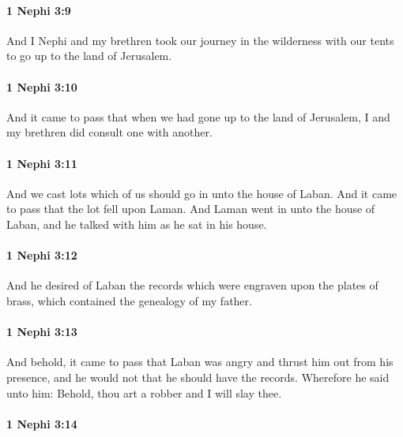 		\paragraph{1 Nephi 3:9} %
			\label{1NEPHI-3-9}

			And I Nephi and my brethren took our journey in the wilderness with our tents
			to go up to the land of Jerusalem.

		\paragraph{1 Nephi 3:10} %
			\label{1NEPHI-3-10}

			And it came to pass that when we had gone up to the land of Jerusalem,
			I and my brethren did consult one with another.

		\paragraph{1 Nephi 3:11} %
			\label{1NEPHI-3-11}

			And we cast lots which of us should go in unto the house of Laban.
			And it came to pass that the lot fell upon Laman.
			And Laman went in unto the house of Laban,
			and he talked with him as he sat in his house.

		\paragraph{1 Nephi 3:12} %
			\label{1NEPHI-3-12}

			And he desired of Laban the records
			which were engraven upon the plates of brass,
			which contained the genealogy of my father.

		\paragraph{1 Nephi 3:13} %
			\label{1NEPHI-3-13}

			And behold, it came to pass that Laban was angry
			and thrust him out from his presence,
			and he would not that he should have the records.
			Wherefore he said unto him:
			Behold, thou art a robber and I will slay thee.

		\paragraph{1 Nephi 3:14} %
			\label{1NEPHI-3-14}


